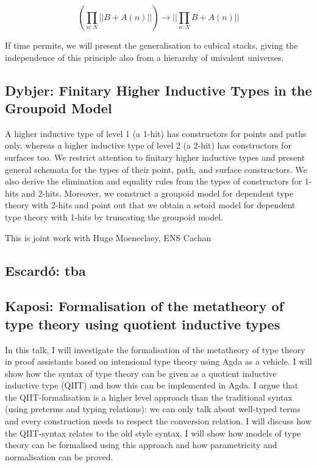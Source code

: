 \documentclass[a4paper,10pt]{scrartcl}
\begin{document}
\[ \left(\prod_{n:N} || B + A(n) ||\right)  \to || \prod_{n:N} B + A(n) || \]

If time permits, we will present the generalisation to cubical stacks, giving the independence of this principle also from a hierarchy of univalent universes.


\subsection*{Dybjer: Finitary Higher Inductive Types in the Groupoid Model}

A higher inductive type of level 1 (a 1-hit) has constructors for points and paths only, whereas a higher inductive type of level 2 (a 2-hit) has constructors for surfaces too. 
We restrict attention to finitary higher inductive types and present general schemata for the types of their point, path, and surface constructors. 
We also derive the elimination and equality rules from the types of constructors for 1-hits and 2-hits. 
Moreover, we construct a groupoid model for dependent type theory with 2-hits and point out that we obtain a setoid model for dependent type theory with 1-hits by truncating the groupoid model.

This is joint work with Hugo Moeneclaey, ENS Cachan

\subsection*{Escardó: tba}


\subsection*{Kaposi: Formalisation of the metatheory of type theory using quotient inductive types}

In this talk, I will investigate the formalisation of the metatheory of type theory in proof assistants based on intensional type theory using Agda as a vehicle. 
I will show how the syntax of type theory can be given as a quotient inductive inductive type (QIIT) and how this can be implemented in Agda. 
I argue that the QIIT-formalisation is a higher level approach than the traditional syntax (using preterms and typing relations): 
we can only talk about well-typed terms and every construction needs to respect the conversion relation. 
I will discuss how the QIIT-syntax relates to the old style syntax. I will show how models of type theory can be formalised using this approach and how parametricity and normalisation can be proved.
\end{document}
